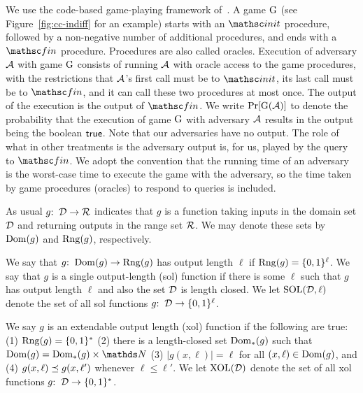We use the code-based game-playing framework of~\cite{EC:BelRog06}. A game $\textnormal{G}$ (see Figure~\ref{fig:cc-indiff} for an example) starts with an $\Initialize$ procedure, followed by a non-negative number of additional procedures, and ends with a $\Finalize$ procedure. Procedures are also called oracles. Execution of adversary $\mathcal{A}$ with game $\textnormal{G}$ consists of running $\mathcal{A}$ with oracle access to the game procedures, with the restrictions that $\mathcal{A}$'s first call must be to $\Initialize$, its last call must be to $\Finalize$, and it can call these two procedures at most once. The output of the execution is the output of $\Finalize$. 
We write $\Pr[\textnormal{G}(\mathcal{A})]$ to denote the probability that the execution of game $\textnormal{G}$ with adversary $\mathcal{A}$ results in the output being the boolean $\mathsf{true}$.
Note that our adversaries have no output. The role of what in other treatments is the adversary output is, for us, played by the query to $\Finalize$. We adopt the convention that the running time of an adversary is the worst-case time to execute the game with the adversary, so the time taken by game procedures (oracles) to respond to queries is included.

 As usual $g{:\;\;}\mathcal{D}\to\mathcal{R}$ indicates that $g$ is a function taking inputs in the domain set $\mathcal{D}$ and returning outputs in the range set $\mathcal{R}$. We may denote these sets by $\mathrm{Dom}({g})$ and $\mathrm{Rng}({g})$, respectively.

We say that $g{:\;\;} \mathrm{Dom}({g}) \to \mathrm{Rng}({g})$ has output length $\ell$ if $\mathrm{Rng}({g})=\{0,1\}^{\ell}$. We say that $g$ is a single output-length (sol) function if there is some $\ell$ such that $g$ has output length $\ell$ and also the set $\mathcal{D}$ is length closed. We let $\mathrm{SOL}(\mathcal{D},\ell)$ denote the set of all sol functions $g{:\;\;}\mathcal{D}\to\{0,1\}^{\ell}$. 

We say $g$ is an extendable output length (xol) function if the following are true: (1) $\mathrm{Rng}({g})=\{0,1\}^*$ (2) there is a length-closed set $\mathrm{Dom}_{*}({g})$ such that $\GGenroSpDom{g} = \GGenroSpDomP{g} \cross\N$ (3) $|g(x,\ell)|=\ell$ for all $(x,\ell)\in\mathrm{Dom}({g})$, and (4) $g(x,\ell)\preceq g(x,\ell')$ whenever $\ell\leq\ell'$. We let $\mathrm{XOL}(\mathcal{D})$ denote the set of all xol functions $g{:\;\;}\mathcal{D}\to\{0,1\}^{*}$. 


